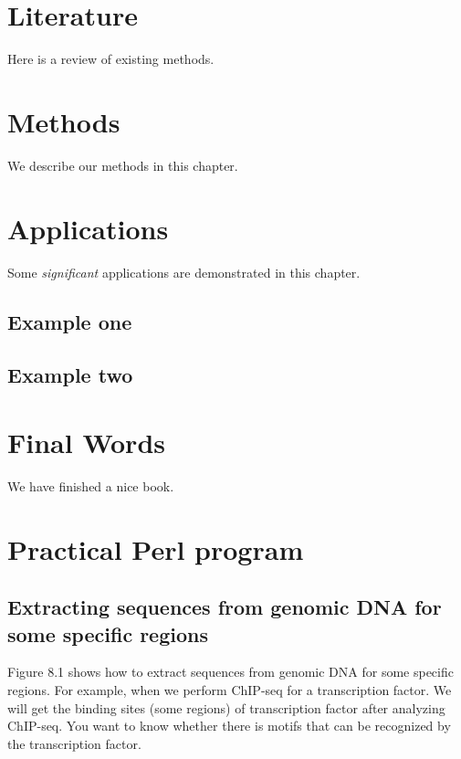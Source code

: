 \documentclass[]{book}
\begin{document}
\chapter{Literature}\label{literature}

Here is a review of existing methods.

\chapter{Methods}\label{methods}

We describe our methods in this chapter.

\chapter{Applications}\label{applications}

Some \emph{significant} applications are demonstrated in this chapter.

\section{Example one}\label{example-one}

\section{Example two}\label{example-two}

\chapter{Final Words}\label{final-words}

We have finished a nice book.

\chapter{Practical Perl program}\label{practical-perl-program}

\section{Extracting sequences from genomic DNA for some specific
regions}\label{extracting-sequences-from-genomic-dna-for-some-specific-regions}

Figure 8.1 shows how to extract sequences from genomic DNA for some
specific regions. For example, when we perform ChIP-seq for a
transcription factor. We will get the binding sites (some regions) of
transcription factor after analyzing ChIP-seq. You want to know whether
there is motifs that can be recognized by the transcription factor.
\end{document}
